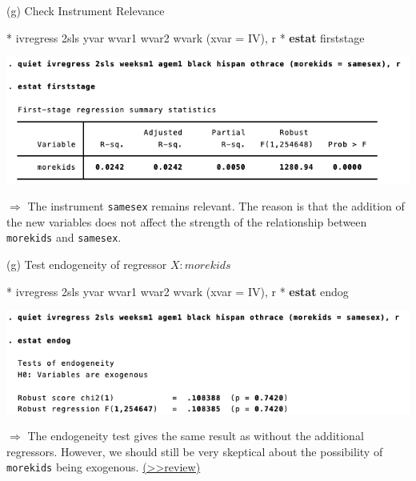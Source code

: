 \documentclass[
  10pt,
  ignorenonframetext,
]{beamer}
\newenvironment{Shaded}{\begin{snugshade}}{\end{snugshade}}
\newcommand{\FunctionTok}[1]{\textcolor[rgb]{0.00,0.00,0.00}{#1}}
\newcommand{\KeywordTok}[1]{\textcolor[rgb]{0.13,0.29,0.53}{\textbf{#1}}}
\newcommand{\NormalTok}[1]{#1}
\begin{document}
\begin{frame}[fragile]{(g) Check Instrument Relevance}
\protect\hypertarget{g-check-instrument-relevance}{}
\small

\begin{Shaded}
\begin{Highlighting}[]
\NormalTok{* ivregress 2sls yvar wvar1 wvar2 wvark (xvar = IV), }\FunctionTok{r}
\NormalTok{* }\KeywordTok{estat}\NormalTok{ firststage}
\end{Highlighting}
\end{Shaded}

\begin{center}\includegraphics[width=0.9\linewidth]{pictures/res7-estatFirstStage2SLS} \end{center}

\(\Rightarrow\) The instrument \texttt{samesex} remains relevant. The
reason is that the addition of the new variables does not affect the
strength of the relationship between \texttt{morekids} and
\texttt{samesex}.
\end{frame}

\begin{frame}[fragile]{(g) Test endogeneity of regressor \(X:morekids\)}
\protect\hypertarget{qa-endog}{}
\small

\begin{Shaded}
\begin{Highlighting}[]
\NormalTok{* ivregress 2sls yvar wvar1 wvar2 wvark (xvar = IV), }\FunctionTok{r}
\NormalTok{* }\KeywordTok{estat}\NormalTok{ endog}
\end{Highlighting}
\end{Shaded}

\begin{center}\includegraphics[width=0.9\linewidth]{pictures/res8-estatEndog2SLS} \end{center}

\(\Rightarrow\) The endogeneity test gives the same result as without
the additional regressors. However, we should still be very skeptical
about the possibility of \texttt{morekids} being exogenous.
\footnotesize\protect\hyperlink{review-endog}{(\textgreater\textgreater review)}
\normalsize
\end{frame}
\end{document}
